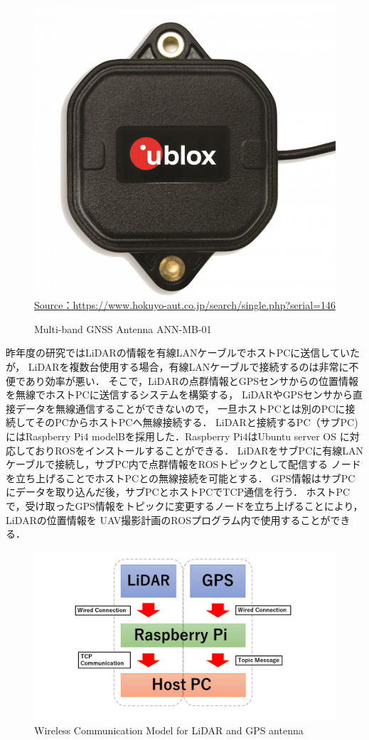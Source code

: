 \documentclass[autodetect-engine,dvipdfmx-if-dvi,ja=standard,a4j,jbase=11pt,magstyle=nomag*]{bxjsreport}
\begin{document}
\begin{figure}[h]
    \centering
    \includegraphics[width=0.6\linewidth, clip]{./figure/chapter4/GPS.png}
    \url{Source：https://www.hokuyo-aut.co.jp/search/single.php?serial=146}
    \caption{Multi-band GNSS Antenna ANN-MB-01}
    \label{fig:GPS}
\end{figure}

昨年度の研究ではLiDARの情報を有線LANケーブルでホストPCに送信していたが，
LiDARを複数台使用する場合，有線LANケーブルで接続するのは非常に不便であり効率が悪い．
そこで，LiDARの点群情報とGPSセンサからの位置情報を無線でホストPCに送信するシステムを構築する，
LiDARやGPSセンサから直接データを無線通信することができないので，
一旦ホストPCとは別のPCに接続してそのPCからホストPCへ無線接続する．
LiDARと接続するPC（サブPC)にはRaspberry Pi4 modelBを採用した．Raspberry Pi4はUbuntu server OS
に対応しておりROSをインストールすることができる．
LiDARをサブPCに有線LANケーブルで接続し，サブPC内で点群情報をROSトピックとして配信する
ノードを立ち上げることでホストPCとの無線接続を可能とする．
GPS情報はサブPCにデータを取り込んだ後，サブPCとホストPCでTCP通信を行う．
ホストPCで，受け取ったGPS情報をトピックに変更するノードを立ち上げることにより，LiDARの位置情報を
UAV撮影計画のROSプログラム内で使用することができる．

\begin{figure}[h]
    \centering
    \includegraphics[width=1.2\linewidth, clip]{./figure/chapter4/wireless_model.png}
    \caption{Wireless Communication Model for LiDAR and GPS antenna}
    \label{fig:wireless_model}
\end{figure}
\end{document}

